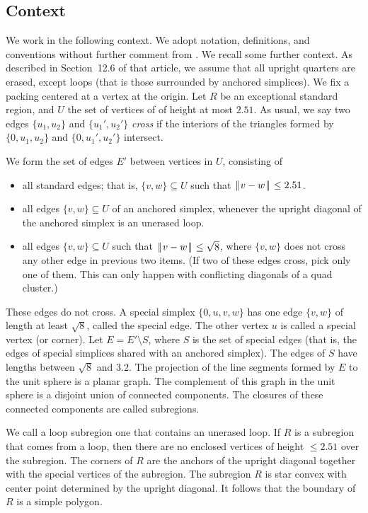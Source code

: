 \documentclass[11pt]{amsart}
\def\|{{\hskip0.1em|\hskip-0.15em|\hskip0.1em}}
\let\subset=\subseteq
\begin{document}
\subsection*{Context}

We work in the following context.  We adopt notation, definitions, and conventions without further comment
from \cite{Hales:2006:DCG}.  We recall some further context.
As described in Section~12.6 of that article, we assume that all upright quarters
are erased, except loops (that is those surrounded by anchored simplices).  We fix a packing centered at a vertex at the origin.  Let $R$ be an exceptional standard region, and
$U$ the set of vertices of of height at most $2.51$.  As usual, we say two edges $\{u_1,u_2\}$ and $\{u_1',u_2'\}$ {\it cross}
if the interiors of the triangles formed by $\{0,u_1,u_2\}$ and $\{0,u_1',u_2'\}$ intersect.

We form the set of edges $E'$ between vertices in $U$, consisting of
\begin{itemize}
\item all standard edges; that is, $\{v,w\}\subset U$ such that $\|v-w\|\le 2.51$.
\item all edges $\{v,w\}\subset U$ of an anchored simplex, whenever the upright diagonal of the anchored simplex is an unerased loop.
\item all edges $\{v,w\}\subset U$ such that $\|v-w\|\le\sqrt8$, where $\{v,w\}$ does not cross any other edge in previous two items.  (If two of these edges cross, pick only one of them. This can only happen with conflicting diagonals
of a quad cluster.)
\end{itemize}
These edges do not cross.  A special simplex $\{0,u,v,w\}$ has one edge $\{v,w\}$ of length at least $\sqrt8$,
called the special edge.  The other vertex $u$ is called a special vertex (or corner).
Let $E=E'\setminus S$, where $S$ is the set of special edges (that
is, the edges of special simplices shared with an anchored simplex).
The edges of $S$ have lengths between $\sqrt8$ and $3.2$.
 The projection of the line segments formed by $E$ to the
unit sphere is a planar graph.
The complement of this graph in the unit sphere
is a disjoint union of connected components.  The closures of these connected components are called subregions.

We call a loop subregion one that contains an unerased loop.
If $R$ is a subregion that comes from a loop, then there are no enclosed vertices of height $\le 2.51$ over the
subregion.  The corners of $R$ are the anchors of the upright diagonal together with the special vertices
of the subregion.  The subregion $R$ is star convex with center point determined by the upright diagonal.
It follows that the boundary of $R$ is a simple polygon.
\end{document}
